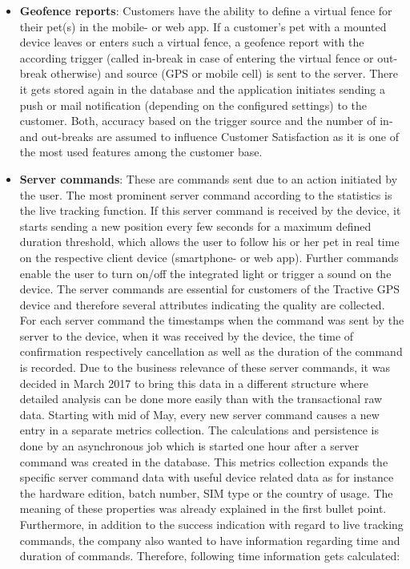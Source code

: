 \begin{itemize}
	\item \textbf{Geofence reports}: Customers have the ability to define a virtual fence for their pet(s) in the mobile- or web app. If a customer's pet with a mounted device leaves or enters such a virtual fence, a geofence report with the according trigger (called in-break in case of entering the virtual fence or out-break otherwise) and source (GPS or mobile cell) is sent to the server. There it gets stored again in the database and the application initiates sending a push or mail notification (depending on the configured settings) to the customer. Both, accuracy based on the trigger source and the number of in- and out-breaks are assumed to influence Customer Satisfaction as it is one of the most used features among the customer base.  
	\item \textbf{Server commands}: These are commands sent due to an action initiated by the user. The most prominent server command according to the statistics is the live tracking function. If this server command is received by the device, it starts sending a new position every few seconds for a maximum defined duration threshold, which allows the user to follow his or her pet in real time on the respective client device (smartphone- or web app). Further commands enable the user to turn on/off the integrated light or trigger a sound on the device. The server commands are essential for customers of the Tractive GPS device and therefore several attributes indicating the quality are collected. For each server command the timestamps when the command was sent by the server to the device, when it was received by the device, the time of confirmation respectively cancellation as well as the duration of the command is recorded. 
	Due to the business relevance of these server commands, it was decided in March 2017 to bring this data in a different structure where detailed analysis can be done more easily than with the transactional raw data. Starting with mid of May, every new server command causes a new entry in a separate metrics collection. The calculations and persistence is done by an asynchronous job which is started one hour after a server command was created in the database. This metrics collection expands the specific server command data with useful device related data as for instance the hardware edition, batch number, SIM type or the country of usage. The meaning of these properties was already explained in the first bullet point. Furthermore, in addition to the success indication with regard to live tracking commands, the company also wanted to have information regarding time and duration of commands. Therefore, following time information gets calculated:
	

\end{itemize}
